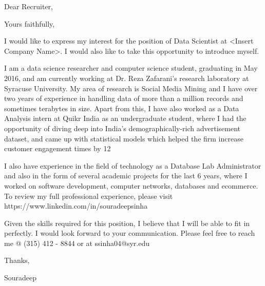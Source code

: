 \documentclass[11pt,letterpaper,sans]{moderncv}        %
\begin{document}
\nocite{*}


\clearpage
\date{January 21, 2016}
\opening{Dear Recruiter,}
\closing{Yours faithfully,}
\makelettertitle

I would like to express my interest for the position of Data Scientist at <Insert Company Name>. I would also like to take this opportunity to introduce myself.

I am a data science researcher and computer science student, graduating in May 2016, and am currently working at Dr. Reza Zafarani's research laboratory at Syracuse University. My area of research is Social Media Mining and I have over two years of experience in handling data of more than a million records and sometimes terabytes in size. Apart from this, I have also worked as a Data Analysis intern at Quikr India as an undergraduate student, where I had the opportunity of diving deep into India's demographically-rich advertisement dataset, and came up with statistical models which helped the firm increase customer engagement times by 12%

I also have experience in the field of technology as a Database Lab Administrator and also in the form of several academic projects for the last 6 years, where I worked on software development, computer networks, databases and ecommerce. To review my full professional experience, please visit https://www.linkedin.com/in/souradeepsinha 

Given the skills required for this position, I believe that I will be able to fit in perfectly. I would look forward to your communication. Please feel free to reach me @ (315) 412 - 8844 or at ssinha04@syr.edu

Thanks,

Souradeep


\makeletterclosing
\fi
\end{document}
